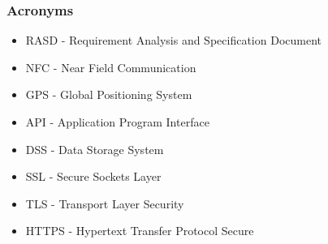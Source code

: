 \subsubsection{Acronyms}
\begin{itemize}
\item RASD - Requirement Analysis and Specification Document
\item NFC - Near Field Communication
\item GPS - Global Positioning System
\item API - Application Program Interface
\item DSS - Data Storage System
\item SSL - Secure Sockets Layer
\item TLS - Transport Layer Security
\item HTTPS - Hypertext Transfer Protocol Secure
\end{itemize}
